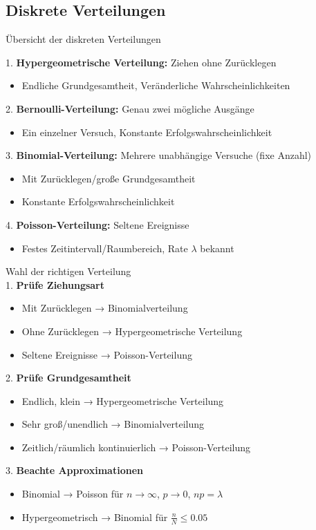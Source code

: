 
\subsection{Diskrete Verteilungen}

\begin{theorem}{Übersicht der diskreten Verteilungen}
    
1. \textbf{Hypergeometrische Verteilung:} Ziehen ohne Zurücklegen
   \begin{itemize}
   \item Endliche Grundgesamtheit, Veränderliche Wahrscheinlichkeiten
   \end{itemize}
2. \textbf{Bernoulli-Verteilung:} Genau zwei mögliche Ausgänge
   \begin{itemize}
   \item Ein einzelner Versuch, Konstante Erfolgswahrscheinlichkeit
   \end{itemize}
3. \textbf{Binomial-Verteilung:} Mehrere unabhängige Versuche (fixe Anzahl)
   \begin{itemize}
   \item Mit Zurücklegen/große Grundgesamtheit
   \item Konstante Erfolgswahrscheinlichkeit
   \end{itemize}
4. \textbf{Poisson-Verteilung:} Seltene Ereignisse
   \begin{itemize}
   \item Festes Zeitintervall/Raumbereich, Rate $\lambda$ bekannt
   \end{itemize}
\end{theorem}

\begin{KR}{Wahl der richtigen Verteilung}\\
1. \textbf{Prüfe Ziehungsart}
   \begin{itemize}
   \item Mit Zurücklegen → Binomialverteilung
   \item Ohne Zurücklegen → Hypergeometrische Verteilung
   \item Seltene Ereignisse → Poisson-Verteilung
   \end{itemize}

2. \textbf{Prüfe Grundgesamtheit}
   \begin{itemize}
   \item Endlich, klein → Hypergeometrische Verteilung
   \item Sehr groß/unendlich → Binomialverteilung
   \item Zeitlich/räumlich kontinuierlich → Poisson-Verteilung
   \end{itemize}

3. \textbf{Beachte Approximationen}
   \begin{itemize}
   \item Binomial → Poisson für $n \to \infty$, $p \to 0$, $np = \lambda$
   \item Hypergeometrisch → Binomial für $\frac{n}{N} \leq 0.05$
   \end{itemize}
\end{KR}


